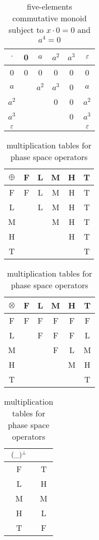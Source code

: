 \begin{table}[hbt]
\begin{center}
  \begin{tabular}{c|ccccc}
  $\cdot$ & 0 & $a$ & $a^2$ & $a^3$ & $\varepsilon$ \\ \hline
0 & 0 & 0 & 0 & 0 & 0 \\
$a$ & & $a^2$ & $a^3$ & 0 & $a$ \\
$a^2$ & &  & 0 & 0 & $a^2$ \\
$a^3$ & &  &   & 0 & $a^3$ \\
$\varepsilon$ & & & & & $\varepsilon$ \\
\end{tabular}
\end{center}
\caption{five-elements commutative monoid subject to $x \cdot 0 = 0$ and $a^4 = 0$}
\label{multTable}
\end{table}

\begin{table}[t]
\begin{center}
   \begin{tabular}{c|ccccc}
  $\oplus$ & F & L & M & H & T \\ \hline
  F   & F & L & M & H & T   \\
  L   &  & L & M & H & T   \\
 M   &  & & M  & H & T   \\
 H   &  & &  & H & T   \\
 T   &   &   &      &    & T \\
  \end{tabular}
\hskip 36pt\begin{tabular}{c|ccccc}
  $\otimes$ & F & L & M & H & T \\ \hline
        F       & F & F & F & F & F \\
        L       &   & F & F & F & L \\
        M      &   &    &  F & L & M \\
        H      &   &   &      & M & H \\
        T      &   &   &      &    & T \\
  \end{tabular}
\hskip 36pt
 \begin{tabular}{c|c}
 ${(\_)^{\bot}}$ &  \\ \hline
F & T \\
L & H \\
M & M \\
H & L \\
T & F \\
 \end{tabular}
\end{center}
\caption{multiplication tables for phase space operators}
\label{interpretationTable}
\end{table}

